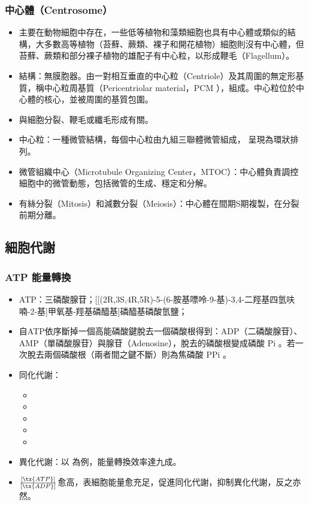 \documentclass[a4paper,12pt]{report}
\begin{document}
\subsubsection{中心體（Centrosome）}
\begin{itemize}
  \item 主要在動物細胞中存在，一些低等植物和藻類細胞也具有中心體或類似的結構，大多數高等植物（苔蘚、蕨類、裸子和開花植物）細胞則沒有中心體，但苔蘚、蕨類和部分裸子植物的雄配子有中心粒，以形成鞭毛（Flagellum）。
  \item 結構：無膜胞器。由一對相互垂直的中心粒（Centriole）及其周圍的無定形基質，稱中心粒周基質（Pericentriolar material，PCM ），組成。中心粒位於中心體的核心，並被周圍的基質包圍。
  \item 與細胞分裂、鞭毛或纖毛形成有關。
  \item 中心粒：一種微管結構，每個中心粒由九組三聯體微管組成， 呈現為環狀排列。
  \item 微管組織中心（Microtubule Organizing Center，MTOC）：中心體負責調控細胞中的微管動態，包括微管的生成、穩定和分解。
  \item 有絲分裂（Mitosis）和減數分裂（Meiosis）：中心體在間期S期複製，在分裂前期分離。
\end{itemize}
\subsection{細胞代謝}
\subsubsection{ATP 能量轉換}
\begin{itemize}
  \item ATP：三磷酸腺苷；[[(2R,3S,4R,5R)-5-(6-胺基嘌呤-9-基)-3,4-二羥基四氫呋喃-2-基]甲氧基-羥基磷醯基]磷醯基磷酸氫鹽；
  \item 自ATP依序斷掉一個高能磷酸鍵脫去一個磷酸根得到：ADP（二磷酸腺苷）、AMP（單磷酸腺苷）與腺苷（Adenosine），脫去的磷酸根變成磷酸 Pi 。若一次脫去兩個磷酸根（兩者間之鍵不斷）則為焦磷酸 PPi 。
  \item 同化代謝：
  \begin{itemize}
    \item {}
    \item {}
    \item {}
    \item {}
    \item {}
\end{itemize}
  \item 異化代謝：以  為例，能量轉換效率達九成。
  \item $\frac{[\tx{ATP}]}{[\tx{ADP}]}$愈高，表細胞能量愈充足，促進同化代謝，抑制異化代謝，反之亦然。
\end{itemize}
\end{document}
